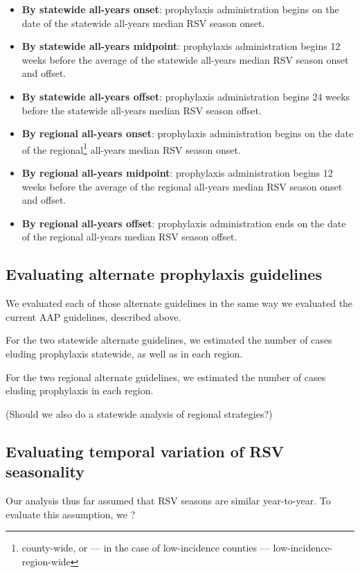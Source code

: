 \documentclass{article}\usepackage[]{graphicx}\usepackage[]{color}
\begin{document}
\begin{multicols}{2}
\begin{itemize}
    \item \textbf{By statewide all-years onset}: prophylaxis administration begins on the date of the statewide all-years median RSV season onset. 
    \item \textbf{By statewide all-years midpoint}: prophylaxis administration begins 12 weeks before the average of the statewide all-years median RSV season onset and offset. 
    \item \textbf{By statewide all-years offset}: prophylaxis administration begins 24 weeks before the statewide all-years median RSV season offset. 
    \item \textbf{By regional all-years onset}: prophylaxis administration begins on the date of the regional\footnote{county-wide, or --- in the case of low-incidence counties --- low-incidence-region-wide} all-years median RSV season onset.
    \item \textbf{By regional all-years midpoint}: prophylaxis administration begins 12 weeks before the average of the regional all-years median RSV season onset and offset. 
    \item \textbf{By regional all-years offset}: prophylaxis administration ends on the date of the regional all-years median RSV season offset. 
\end{itemize}

\subsection{Evaluating alternate prophylaxis guidelines}

We evaluated each of those alternate guidelines in the same way we evaluated the current AAP guidelines, described above. 

For the two statewide alternate guidelines, we estimated the number of cases eluding prophylaxis statewide, as well as in each region.

For the two regional alternate guidelines, we estimated the number of cases eluding prophylaxis in each region.

(Should we also do a statewide analysis of regional strategies?)

\subsection{Evaluating temporal variation of RSV seasonality}

Our analysis thus far assumed that RSV seasons are similar year-to-year. To evaluate this assumption, we ?


\end{multicols}
\end{document}
